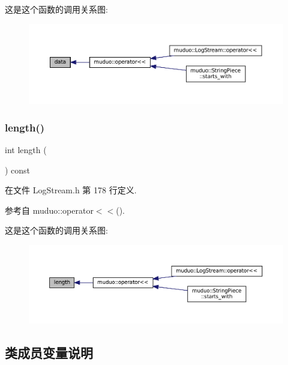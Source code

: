 这是这个函数的调用关系图\+:
\nopagebreak
\begin{figure}[H]
\begin{center}
\leavevmode
\includegraphics[width=350pt]{classmuduo_1_1Fmt_a39a256207a84f316547e36c755373d03_icgraph}
\end{center}
\end{figure}
\mbox{\label{classmuduo_1_1Fmt_a91213974fa3ac3959b1c355a9e588f8d}} 
\subsubsection{\texorpdfstring{length()}{length()}}
{\footnotesize\ttfamily int length (\begin{DoxyParamCaption}{ }\end{DoxyParamCaption}) const\hspace{0.3cm}{\ttfamily [inline]}}



在文件 Log\+Stream.\+h 第 178 行定义.



参考自 muduo\+::operator$<$$<$().

这是这个函数的调用关系图\+:
\nopagebreak
\begin{figure}[H]
\begin{center}
\leavevmode
\includegraphics[width=350pt]{classmuduo_1_1Fmt_a91213974fa3ac3959b1c355a9e588f8d_icgraph}
\end{center}
\end{figure}


\subsection{类成员变量说明}
\mbox{\label{classmuduo_1_1Fmt_a126f015f392ef682c26bb6f0f732f57e}} 
